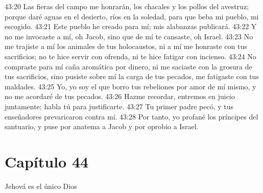43:20 Las fieras del campo me honrarán, los chacales y los pollos del avestruz; porque daré aguas en el desierto, ríos en la soledad, para que beba mi pueblo, mi escogido. 
43:21 Este pueblo he creado para mí; mis alabanzas publicará. 
43:22 Y no me invocaste a mí, oh Jacob, sino que de mí te cansaste, oh Israel. 
43:23 No me trajiste a mí los animales de tus holocaustos, ni a mí me honraste con tus sacrificios; no te hice servir con ofrenda, ni te hice fatigar con incienso. 
43:24 No compraste para mí caña aromática por dinero, ni me saciaste con la grosura de tus sacrificios, sino pusiste sobre mí la carga de tus pecados, me fatigaste con tus maldades. 
43:25 Yo, yo soy el que borro tus rebeliones por amor de mí mismo, y no me acordaré de tus pecados. 
43:26 Hazme recordar, entremos en juicio juntamente; habla tú para justificarte. 
43:27 Tu primer padre pecó, y tus enseñadores prevaricaron contra mí. 
43:28 Por tanto, yo profané los príncipes del santuario, y puse por anatema a Jacob y por oprobio a Israel. 
\section*{Capítulo 44 }
Jehová es el único Dios 

